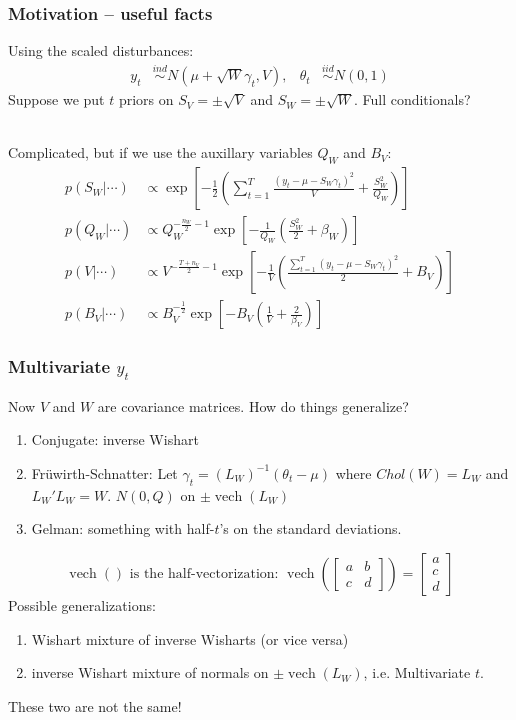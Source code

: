 \documentclass[xcolor=dvipsnames]{beamer}
\DeclareMathOperator{\vech}{vech}
\begin{document}
\begin{frame}
\frametitle{Motivation -- useful facts}
Using the scaled disturbances:
\begin{align*}
 y_t &\stackrel{ind}{\sim} N(\mu + \sqrt{W}\gamma_t, V), & \theta_t &\stackrel{iid}{\sim} N(0,1)
\end{align*}
Suppose we put $t$ priors on $S_V=\pm\sqrt{V}$ and $S_W=\pm\sqrt{W}$. Full conditionals?\\~ \pause

Complicated, but if we use the auxillary variables $Q_W$ and $B_V$:
\begin{align*}
p(S_W|\cdots ) &\propto \exp\left[-\frac{1}{2}\left(\sum_{t=1}^T\frac{(y_t - \mu - S_W\gamma_t)^2}{V} + \frac{S^2_W}{Q_W}\right)\right]\\
p(Q_W|\cdots ) &\propto Q_W^{-\frac{n_W}{2} - 1}\exp\left[-\frac{1}{Q_W}\left(\frac{S_W^2}{2} + \beta_W\right)\right]\\
p(V|\cdots ) & \propto V^{-\frac{T + n_V}{2} - 1}\exp\left[-\frac{1}{V}\left(\frac{\sum_{t=1}^T(y_t - \mu - S_W\gamma_t)^2}{2} + B_V\right)\right]\\
p(B_V|\cdots ) & \propto B_V^{-\frac{1}{2}}\exp\left[-B_V\left(\frac{1}{V} + \frac{2}{\beta_V}\right)\right]
\end{align*}
\end{frame}

\begin{frame}
\frametitle{Multivariate $y_t$}
Now $V$ and $W$ are covariance matrices. How do things generalize?
\begin{enumerate}
\item Conjugate: inverse Wishart
\item Fr{\"u}wirth-Schnatter: Let $\gamma_t = (L_W)^{-1}(\theta_t - \mu)$ where $Chol(W)=L_W$ and $L_W'L_W=W$. $N(0,Q)$ on $\pm\vech(L_W)$
\item Gelman: something with half-$t$'s on the standard deviations.
\end{enumerate}
\[
\mbox{$\vech()$ is the half-vectorization:  }\vech\left(\begin{bmatrix} a & b \\ c & d \end{bmatrix}\right) = \begin{bmatrix}a\\c\\d\end{bmatrix}
\]
\pause Possible generalizations:\\
\begin{enumerate}
\item Wishart mixture of inverse Wisharts (or vice versa)
\item inverse Wishart mixture of normals on $\pm\vech(L_W)$, i.e. Multivariate $t$.
\end{enumerate}
\pause These two are not the same! 
\end{frame}
\end{document}
